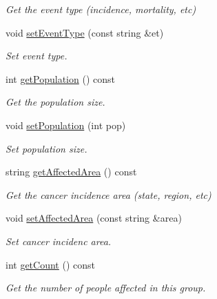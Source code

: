 \begin{DoxyCompactItemize}
\begin{DoxyCompactList}\small\item\em Get the event type (incidence, mortality, etc) \end{DoxyCompactList}\item 
void \mbox{\hyperlink{classbridges_1_1dataset_1_1_cancer_incidence_aab3f76d957b69ef5fcefb491388e1d29}{set\+Event\+Type}} (const string \&et)
\begin{DoxyCompactList}\small\item\em Set event type. \end{DoxyCompactList}\item 
int \mbox{\hyperlink{classbridges_1_1dataset_1_1_cancer_incidence_a7f34f811c1e0a40e52e91d55653fe656}{get\+Population}} () const
\begin{DoxyCompactList}\small\item\em Get the population size. \end{DoxyCompactList}\item 
void \mbox{\hyperlink{classbridges_1_1dataset_1_1_cancer_incidence_a468eae18b9af44a25fe3f586283875e4}{set\+Population}} (int pop)
\begin{DoxyCompactList}\small\item\em Set population size. \end{DoxyCompactList}\item 
string \mbox{\hyperlink{classbridges_1_1dataset_1_1_cancer_incidence_abb62f6d102dc571ab46b633de8365b86}{get\+Affected\+Area}} () const
\begin{DoxyCompactList}\small\item\em Get the cancer incidence area (state, region, etc) \end{DoxyCompactList}\item 
void \mbox{\hyperlink{classbridges_1_1dataset_1_1_cancer_incidence_a0eaa01e6c760702ca0e69dca16919c9b}{set\+Affected\+Area}} (const string \&area)
\begin{DoxyCompactList}\small\item\em Set cancer incidenc area. \end{DoxyCompactList}\item 
int \mbox{\hyperlink{classbridges_1_1dataset_1_1_cancer_incidence_a3841428ae70cac0663153d22a46080df}{get\+Count}} () const
\begin{DoxyCompactList}\small\item\em Get the number of people affected in this group. \end{DoxyCompactList}\item 

\end{DoxyCompactItemize}
